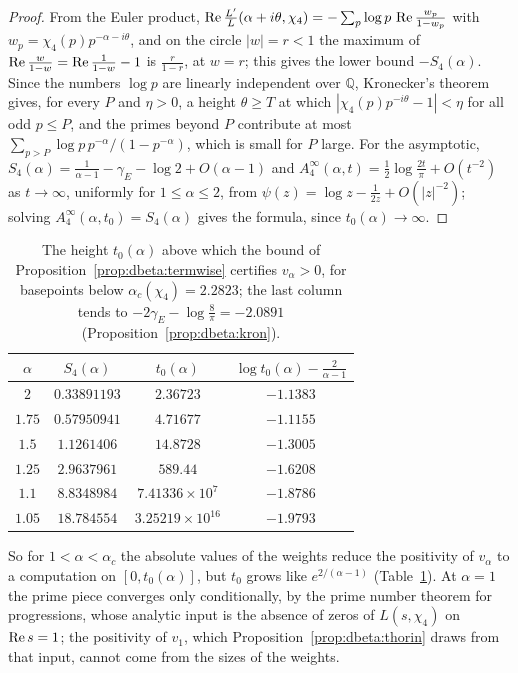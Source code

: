\begin{proof}
From the Euler product, $\operatorname{Re}\frac{L'}L(\alpha+i\theta,\chi_4)=-\sum_p\log p\,\operatorname{Re}\frac{w_p}{1-w_p}$ with $w_p=\chi_4(p)p^{-\alpha-i\theta}$, and on the circle $|w|=r<1$ the maximum of $\operatorname{Re}\frac w{1-w}=\operatorname{Re}\frac1{1-w}-1$ is $\frac r{1-r}$, at $w=r$; this gives the lower bound $-S_4(\alpha)$. Since the numbers $\log p$ are linearly independent over $\mathbb Q$, Kronecker's theorem \cite[Chapter 23]{boHardyWright} gives, for every $P$ and $\eta>0$, a height $\theta\ge T$ at which $|\chi_4(p)p^{-i\theta}-1|<\eta$ for all odd $p\le P$, and the primes beyond $P$ contribute at most $\sum_{p>P}\log p\,p^{-\alpha}/(1-p^{-\alpha})$, which is small for $P$ large. For the asymptotic, $S_4(\alpha)=\frac1{\alpha-1}-\gamma_E-\log2+O(\alpha-1)$ and $A^\infty_4(\alpha,t)=\frac12\log\frac{2t}\pi+O(t^{-2})$ as $t\to\infty$, uniformly for $1\le\alpha\le2$, from $\psi(z)=\log z-\frac1{2z}+O(|z|^{-2})$; solving $A^\infty_4(\alpha,t_0)=S_4(\alpha)$ gives the formula, since $t_0(\alpha)\to\infty$.
\end{proof}

\begin{table}[htbp]
\centering\small
\begin{tabular}{cccc}
\toprule
$\alpha$ & $S_4(\alpha)$ & $t_0(\alpha)$ & $\log t_0(\alpha)-\frac2{\alpha-1}$\\
\midrule
$2$ & $0.33891193$ & $2.36723$ & $-1.1383$\\
$1.75$ & $0.57950941$ & $4.71677$ & $-1.1155$\\
$1.5$ & $1.1261406$ & $14.8728$ & $-1.3005$\\
$1.25$ & $2.9637961$ & $589.44$ & $-1.6208$\\
$1.1$ & $8.8348984$ & $7.41336\times10^7$ & $-1.8786$\\
$1.05$ & $18.784554$ & $3.25219\times10^{16}$ & $-1.9793$\\
\bottomrule
\end{tabular}
\caption{The height $t_0(\alpha)$ above which the bound of Proposition~\ref{prop:dbeta:termwise} certifies $v_\alpha>0$, for basepoints below $\alpha_c(\chi_4)=2.2823$; the last column tends to $-2\gamma_E-\log\frac8\pi=-2.0891$ (Proposition~\ref{prop:dbeta:kron}).}
\label{tab:dbeta:kron}
\end{table}

So for $1<\alpha<\alpha_c$ the absolute values of the weights reduce the positivity of $v_\alpha$ to a computation on $[0,t_0(\alpha)]$, but $t_0$ grows like $e^{2/(\alpha-1)}$ (Table~\ref{tab:dbeta:kron}). At $\alpha=1$ the prime piece converges only conditionally, by the prime number theorem for progressions, whose analytic input is the absence of zeros of $L(s,\chi_4)$ on $\operatorname{Re} s=1$; the positivity of $v_1$, which Proposition~\ref{prop:dbeta:thorin} draws from that input, cannot come from the sizes of the weights.

